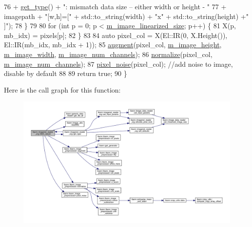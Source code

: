 \begin{DoxyCode}
76                           + \hyperlink{classlbann_1_1imagenet__reader__org_ade6e7e9bc1a3f9562c0f274a3d665e0a}{get\_type}() + \textcolor{stringliteral}{": mismatch data size -- either width or height - "}
77                           + imagepath + \textcolor{stringliteral}{"[w,h]=["} + std::to\_string(width) + \textcolor{stringliteral}{"x"} + std::to\_string(height) +\textcolor{stringliteral}{"
      ]"});
78   \}
79 
80   \textcolor{keywordflow}{for} (\textcolor{keywordtype}{int} p = 0; p < \hyperlink{classlbann_1_1image__data__reader_af512f1f866c0f654309b7f28886dca9a}{m\_image\_linearized\_size}; p++) \{
81     X(p, mb\_idx) = pixels[p];
82   \}
83 
84   \textcolor{keyword}{auto} pixel\_col = X(El::IR(0, X.Height()), El::IR(mb\_idx, mb\_idx + 1));
85   \hyperlink{classlbann_1_1lbann__image__preprocessor_a27cb5182c4f764cbfa4edecbb78ef29d}{augment}(pixel\_col, \hyperlink{classlbann_1_1image__data__reader_a0632efa3deaa9d61e671f741909eb3fe}{m\_image\_height}, \hyperlink{classlbann_1_1image__data__reader_af001f3d1c0f1c580b66988233b3a64f0}{m\_image\_width}, 
      \hyperlink{classlbann_1_1image__data__reader_aab1a440f361521dc7bd583cefe1061f8}{m\_image\_num\_channels});
86   \hyperlink{classlbann_1_1lbann__image__preprocessor_ae370cdc9f776ce8cce94a45cacf47425}{normalize}(pixel\_col, \hyperlink{classlbann_1_1image__data__reader_aab1a440f361521dc7bd583cefe1061f8}{m\_image\_num\_channels});
87   \hyperlink{classlbann_1_1lbann__image__preprocessor_aece5b572d0a2fe123cc66412d7a5c91e}{pixel\_noise}(pixel\_col); \textcolor{comment}{//add noise to image, disable by default}
88 
89   \textcolor{keywordflow}{return} \textcolor{keyword}{true};
90 \}
\end{DoxyCode}
Here is the call graph for this function\+:\nopagebreak
\begin{figure}[H]
\begin{center}
\leavevmode
\includegraphics[width=350pt]{classlbann_1_1imagenet__reader__org_ad4c47413e16c1c53000b7d7be757ff6e_cgraph}
\end{center}
\end{figure}
